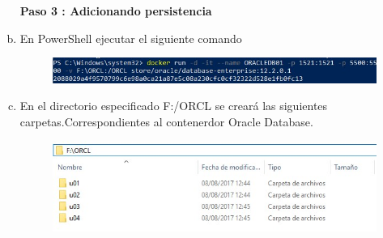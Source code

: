 \documentclass[preprint,12pt]{elsarticle}
\begin{document}
\begin{enumerate}[a)]
\textbf{Paso 3 : Adicionando persistencia}
\item En PowerShell ejecutar el siguiente comando\newline
\begin{figure}[htb]
	\begin{center}
		\includegraphics[width=13cm]{./IMAGENES/Docker8_17}
	\end{center}
\end{figure}
\item En el directorio especificado F:/ORCL se creará las siguientes carpetas.Correspondientes al contenerdor Oracle Database.
\begin{figure}[htb]
	\begin{center}
		\includegraphics[width=13cm]{./IMAGENES/Docker8_18}
	\end{center}
\end{figure}
\end{enumerate}

\end{document}
